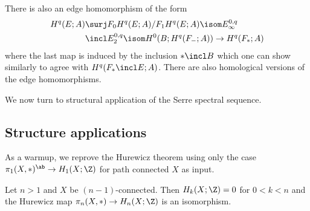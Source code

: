 There is also an edge homomorphism of the form
\begin{align*}
	H^q(E; A) &\surj F_0 H^q(E; A) / F_1 H^q(E; A) \isom E_\infty^{0, q} \\
			  &\incl E_2^{0, q} \isom H^0(B; H^q(F_{-}; A)) \to H^q(F_*; A)
\end{align*}
where the last map is induced by the inclusion $* \incl B$ which one can show similarly to agree with $H^q(F_* \incl E; A)$.
There are also homological versions of the edge homomorphisms.

We now turn to structural application of the Serre spectral sequence.

\subsection{Structure applications}
As a warmup, we reprove the Hurewicz theorem using only the case $\pi_1(X, *)^\ab \to H_1(X; \Z)$ for path connected $X$ as input.
\begin{proposition}[Hurewicz]\label{thm:hurewicz}
	Let $n > 1$ and $X$ be $(n - 1)$-connected.
	Then $H_k(X; \Z) = 0$ for $0 < k < n$ and the Hurewicz map $\pi_n(X, *) \to H_n(X; \Z)$ is an isomorphism.
\end{proposition}
